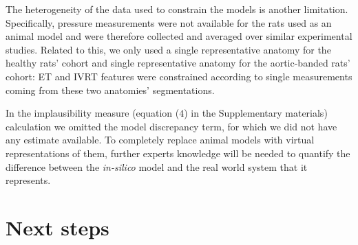 \vspace{0.2cm}
The heterogeneity of the data used to constrain the models is another limitation. Specifically, pressure measurements were not available for the rats used as an animal model and were therefore collected and averaged over similar experimental studies. Related to this, we only used a single representative anatomy for the healthy rats' cohort and single representative anatomy for the aortic-banded rats' cohort: ET and IVRT features were constrained according to single measurements coming from these two anatomies' segmentations.

\vspace{0.2cm}
In the implausibility measure (equation ($4$) in the Supplementary materials) calculation we omitted the model discrepancy term, for which we did not have any estimate available. To completely replace animal models with virtual representations of them, further experts knowledge will be needed to quantify the difference between the \textit{in-silico} model and the real world system that it represents.


%
%
%
\section{Next steps}\label{sec:ch9next_steps}